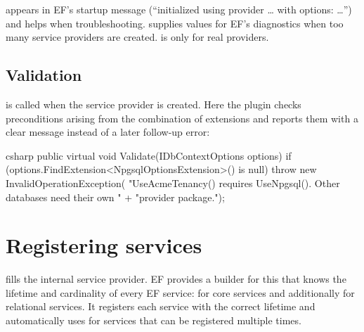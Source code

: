  appears in EF's startup message (“initialized using provider
… with options: …”) and helps when troubleshooting.
 supplies values for EF's diagnostics when
too many service providers are created. 
is  only for real providers.

\section{Validation}

 is called when the service provider is created. Here the plugin checks
preconditions arising from the combination of extensions and reports them with a clear
message instead of a later follow-up error:

\begin{sourcecode}{csharp}
public virtual void Validate(IDbContextOptions options)
{
    if (options.FindExtension<NpgsqlOptionsExtension>() is null)
        throw new InvalidOperationException(
            "UseAcmeTenancy() requires UseNpgsql(). Other databases need their own "
            + "provider package.");
}
\end{sourcecode}

\chapter{Registering services}\label{ch:registering-services}

 fills the internal service provider. EF provides a builder
for this that knows the lifetime and cardinality of every EF service:
 for core
services and
additionally for relational services. It registers each service with the correct lifetime
and automatically uses  for services that
can be registered multiple times.

